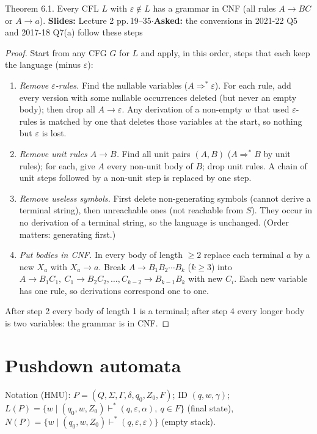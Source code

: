 \documentclass[10.5pt,a4paper]{article}
\newcommand{\src}[2]{{\footnotesize\color{gray!70!black}\textbf{Slides:} #1\enspace$\cdot$\enspace\textbf{Asked:} #2}\par}
\newcommand{\eps}{\varepsilon}
\begin{document}
\begin{thm}{Theorem 6.1. Every CFL $L$ with $\eps\notin L$ has a grammar in CNF (all rules $A\to BC$ or $A\to a$).}
\src{Lecture 2 pp.\,19--35}{the conversions in 2021-22 Q5 and 2017-18 Q7(a) follow these steps}\end{thm}
\begin{proof}
Start from any CFG $G$ for $L$ and apply, in this order, steps that each keep the language (minus $\eps$):
\begin{enumerate}
\item \emph{Remove $\eps$-rules.} Find the nullable variables ($A\Rightarrow^*\eps$). For each rule, add every version with some nullable
occurrences deleted (but never an empty body); then drop all $A\to\eps$. Any derivation of a non-empty $w$ that used $\eps$-rules is
matched by one that deletes those variables at the start, so nothing but $\eps$ is lost.
\item \emph{Remove unit rules $A\to B$.} Find all unit pairs $(A,B)$ ($A\Rightarrow^*B$ by unit rules); for each, give $A$ every non-unit body of
$B$; drop unit rules. A chain of unit steps followed by a non-unit step is replaced by one step.
\item \emph{Remove useless symbols.} First delete non-generating symbols (cannot derive a terminal string), then unreachable ones (not
reachable from $S$). They occur in no derivation of a terminal string, so the language is unchanged. (Order matters: generating first.)
\item \emph{Put bodies in CNF.} In every body of length $\ge2$ replace each terminal $a$ by a new $X_a$ with $X_a\to a$. Break
$A\to B_1B_2\cdots B_k$ ($k\ge3$) into $A\to B_1C_1,\ C_1\to B_2C_2,\dots,C_{k-2}\to B_{k-1}B_k$ with new $C_i$. Each new variable has one
rule, so derivations correspond one to one.
\end{enumerate}
After step 2 every body of length 1 is a terminal; after step 4 every longer body is two variables: the grammar is in CNF.
\end{proof}

\section{Pushdown automata}

Notation (HMU): $P=(Q,\Sigma,\Gamma,\delta,q_0,Z_0,F)$; ID $(q,w,\gamma)$;
$L(P)=\{w\mid(q_0,w,Z_0)\vdash^*(q,\eps,\alpha),\ q\in F\}$ (final state), $N(P)=\{w\mid(q_0,w,Z_0)\vdash^*(q,\eps,\eps)\}$ (empty stack).
\end{document}
